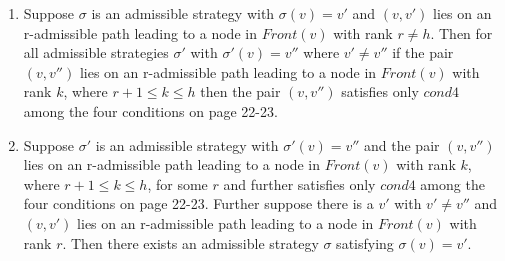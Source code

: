 \begin{lemma}
	\label{lemma4}
	\begin{enumerate}
		\item Suppose $\sigma$ is an admissible strategy with $\sigma(v) = v'$ and $(v,v')$ lies on an r-admissible path leading to a node in $\mathit{Front}(v)$ with rank $r \neq h$. Then for all admissible strategies $\sigma'$ with $\sigma'(v) = v''$ where $v' \neq v''$ if the pair $(v,v'')$ lies on an r-admissible path leading to a node in $\mathit{Front}(v)$ with rank $k$, where $r+1 \leq k \leq h$ then the pair $(v,v'')$ satisfies only $cond4$ among the four conditions on page 22-23.
		\item Suppose $\sigma'$ is an admissible strategy with $\sigma'(v) = v''$ and the pair $(v,v'')$ lies on an r-admissible path leading to a node in $\mathit{Front}(v)$ with rank $k$, where $r+1 \leq k \leq h$, for some $r$ and further satisfies only $cond4$ among the four conditions on page 22-23. Further suppose there is a $v'$ with $v' \neq v''$ and $(v,v')$ lies on an r-admissible path leading to a node in $\mathit{Front}(v)$ with rank $r$. Then there exists an admissible strategy $\sigma$ satisfying $\sigma(v) = v'$. 
	\end{enumerate}
\end{lemma}
